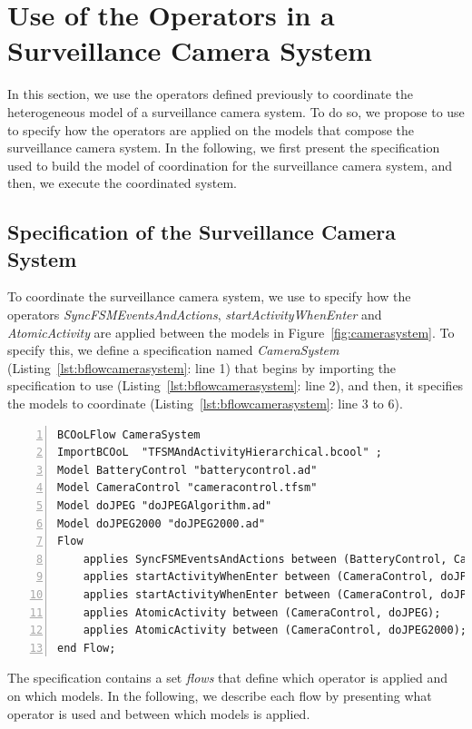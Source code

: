 \section{Use of the Operators in a Surveillance Camera System}
In this section, we use the operators defined previously to coordinate the heterogeneous model of a surveillance camera system. To do so, we propose to use \bflow to specify how the operators are applied on the models that compose the surveillance camera system. In the following, we first present the \bflow specification used to build the model of coordination for the surveillance camera system, and then, we execute the coordinated system. 

\subsection{\bflow Specification of the Surveillance Camera System}
To coordinate the surveillance camera system, we use \bflow to specify how the operators \emph{SyncFSMEventsAndActions}, \emph{startActivityWhenEnter} and \emph{AtomicActivity} are applied between the models in Figure~\ref{fig:camerasystem}. To specify this, we define a \bflow specification named \emph{CameraSystem} (Listing~\ref{lst:bflowcamerasystem}: line 1) that begins by importing the \bcool specification to use (Listing~\ref{lst:bflowcamerasystem}: line 2), and then, it specifies the models to coordinate (Listing~\ref{lst:bflowcamerasystem}: line 3 to 6).

\begin{lstlisting}[language=bflow,
caption={\bflow specification for the Surveillance Camera System},
label={lst:bflowcamerasystem}, 
basicstyle=\scriptsize\ttfamily, backgroundcolor=\color{LGrey}, numbers=left, xleftmargin=2pt]
BCOoLFlow CameraSystem
ImportBCOoL  "TFSMAndActivityHierarchical.bcool" ;
Model BatteryControl "batterycontrol.ad"
Model CameraControl "cameracontrol.tfsm"
Model doJPEG "doJPEGAlgorithm.ad"
Model doJPEG2000 "doJPEG2000.ad"
Flow 
	applies SyncFSMEventsAndActions between (BatteryControl, CameraControl);
	applies startActivityWhenEnter between (CameraControl, doJPEG);
	applies startActivityWhenEnter between (CameraControl, doJPEG2000);
	applies AtomicActivity between (CameraControl, doJPEG);		
	applies AtomicActivity between (CameraControl, doJPEG2000);		
end Flow;
\end{lstlisting}

The specification contains a set \emph{flows} that define which operator is applied and on which models. In the following, we describe each flow by presenting what operator is used and between which models is applied.  

